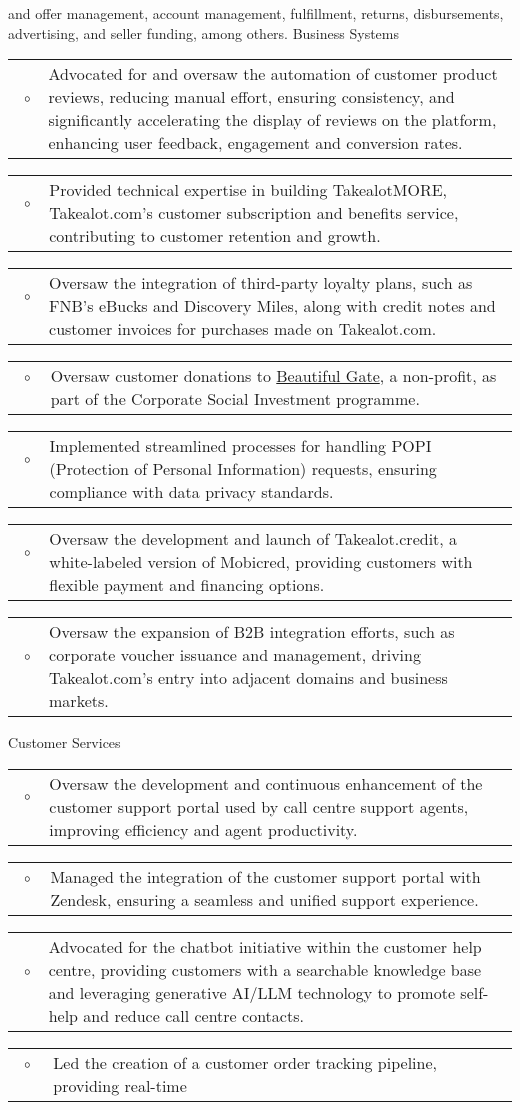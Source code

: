 \documentclass[10pt,a4paper,final]{columncv}
\makeatletter
\newcommand{\cvitembullet}[1]{%
  \begin{tabularx}{\linewidth}{@{}l@{\hspace{0.1em}}X@{}}
    ~$\circ$~ & #1 \\
  \end{tabularx}%
}
\makeatother
\begin{document}
\begin{cvenv}
{{              and offer management, account management, fulfillment, returns, disbursements,
              advertising, and seller funding, among others.}
          Business Systems
             \cvitembullet{Advocated for and oversaw the automation of customer product reviews,
              reducing manual effort, ensuring consistency, and significantly accelerating the
              display of reviews on the platform, enhancing user feedback, engagement and conversion
              rates.}
             \cvitembullet{Provided technical expertise in building TakealotMORE, Takealot.com's
              customer subscription and benefits service, contributing to customer retention and
              growth.}
             \cvitembullet{Oversaw the integration of third-party loyalty plans, such as FNB's
              eBucks and Discovery Miles, along with credit notes and customer invoices for purchases
              made on Takealot.com.}
             \cvitembullet{Oversaw customer donations to \href{https://www.beautifulgatesouthafrica.org/}{Beautiful Gate},
              a non-profit, as part of the Corporate Social Investment programme.}
             \cvitembullet{Implemented streamlined processes for handling POPI (Protection of Personal
              Information) requests, ensuring compliance with data privacy standards.}
             \cvitembullet{Oversaw the development and launch of Takealot.credit, a white-labeled
              version of Mobicred, providing customers with flexible payment and financing options.}
             \cvitembullet{Oversaw the expansion of B2B integration efforts, such as corporate
              voucher issuance and management, driving Takealot.com's entry into adjacent domains and
              business markets.}
          }
         {Customer Services
             \cvitembullet{Oversaw the development and continuous enhancement of the customer support
              portal used by call centre support agents, improving efficiency and agent productivity.}
             \cvitembullet{Managed the integration of the customer support portal with Zendesk,
              ensuring a seamless and unified support experience.}
             \cvitembullet{Advocated for the chatbot initiative within the customer help centre,
              providing customers with a searchable knowledge base and leveraging generative AI/LLM
              technology to promote self-help and reduce call centre contacts.}
             \cvitembullet{Led the creation of a customer order tracking pipeline, providing real-time
}}
\end{cvenv}
\end{document}
